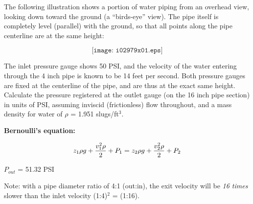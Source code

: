 

The following illustration shows a portion of water piping from an overhead view, looking down toward the ground (a ``birds-eye'' view).  The pipe itself is completely level (parallel) with the ground, so that all points along the pipe centerline are at the same height:

$$\texttt{[image: i02979x01.eps]}$$

The inlet pressure gauge shows 50 PSI, and the velocity of the water entering through the 4 inch pipe is known to be 14 feet per second.  Both pressure gauges are fixed at the centerline of the pipe, and are thus at the exact same height.  Calculate the pressure registered at the outlet gauge (on the 16 inch pipe section) in units of PSI, assuming inviscid (frictionless) flow throughout, and a mass density for water of $\rho$ = 1.951 slugs/ft$^{3}$.

\vskip 10pt

\noindent
{\bf Bernoulli's equation:}

$$z_1 \rho g + {v_1^2 \rho \over 2} + P_1 = z_2 \rho g + {v_2^2 \rho \over 2} + P_2$$







$P_{out}$ = 51.32 PSI

\vskip 10pt

Note: with a pipe diameter ratio of 4:1 (out:in), the exit velocity will be {\it 16 times} slower than the inlet velocity (1:4)$^{2}$ = (1:16).











